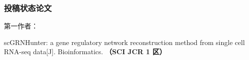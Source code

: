 \subsubsection*{投稿状态论文}
第一作者：
\begin{enumerate}[label={[\arabic*]},itemindent=2em,wide]
\item scGRNHunter: a gene regulatory network reconstruction method from single cell RNA-seq data[J]. Bioinformatics. {\bfseries \heiti（SCI JCR 1 区）}
\end{enumerate}



